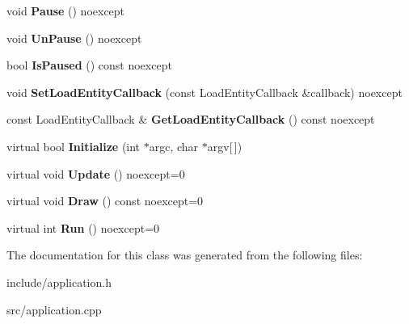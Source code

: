 \begin{DoxyCompactItemize}
void {\bfseries Pause} () noexcept
\item 
\mbox{\label{class_blade_1_1_application_ab8626a9bc16bffa5d94d2e5851e378a2}} 
void {\bfseries Un\+Pause} () noexcept
\item 
\mbox{\label{class_blade_1_1_application_a80cb2abe5d175dde76be4f461bd82183}} 
bool {\bfseries Is\+Paused} () const noexcept
\item 
\mbox{\label{class_blade_1_1_application_a328d42f7cb14a418ad3b9c54aa055132}} 
void {\bfseries Set\+Load\+Entity\+Callback} (const Load\+Entity\+Callback \&callback) noexcept
\item 
\mbox{\label{class_blade_1_1_application_ac5964be32df8e0787b832896c0811ae6}} 
const Load\+Entity\+Callback \& {\bfseries Get\+Load\+Entity\+Callback} () const noexcept
\item 
\mbox{\label{class_blade_1_1_application_a5abbd8e3d830a6543f4abbc2d100c562}} 
virtual bool {\bfseries Initialize} (int $\ast$argc, char $\ast$argv\mbox{[}$\,$\mbox{]})
\item 
\mbox{\label{class_blade_1_1_application_a18b70b1a66b3c639e723464a0f31cc5f}} 
virtual void {\bfseries Update} () noexcept=0
\item 
\mbox{\label{class_blade_1_1_application_a660b728e2e7855548d02316c328da2f7}} 
virtual void {\bfseries Draw} () const noexcept=0
\item 
\mbox{\label{class_blade_1_1_application_a969f20210bd185cc6912b7794a0eea5b}} 
virtual int {\bfseries Run} () noexcept=0
\end{DoxyCompactItemize}


The documentation for this class was generated from the following files\+:\begin{DoxyCompactItemize}
\item 
include/application.\+h\item 
src/application.\+cpp\end{DoxyCompactItemize}
